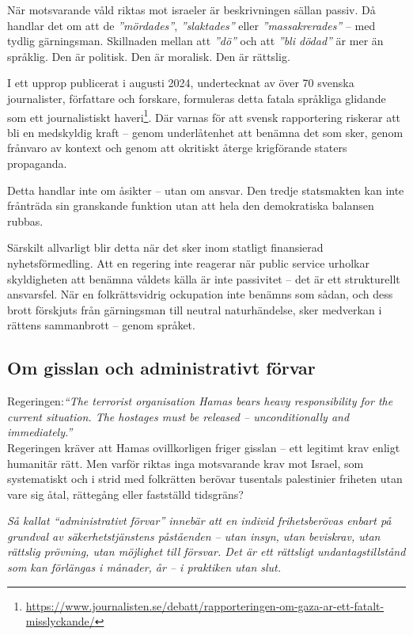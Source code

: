 \documentclass[12pt]{article}
\begin{document}
När motsvarande våld riktas mot israeler är beskrivningen sällan passiv. Då handlar det om att de \textit{”mördades”}, \textit{”slaktades”} eller \textit{”massakrerades”} – med tydlig gärningsman. Skillnaden mellan att \textit{”dö”} och att \textit{”bli dödad”} är mer än språklig. Den är politisk. Den är moralisk. Den är rättslig.

I ett upprop publicerat i augusti 2024, undertecknat av över 70 svenska journalister, författare och forskare, formuleras detta fatala språkliga glidande som ett journalistiskt haveri\footnote{\url{https://www.journalisten.se/debatt/rapporteringen-om-gaza-ar-ett-fatalt-misslyckande/}}. Där varnas för att svensk rapportering riskerar att bli en medskyldig kraft – genom underlåtenhet att benämna det som sker, genom frånvaro av kontext och genom att okritiskt återge krigförande staters propaganda.

Detta handlar inte om åsikter – utan om ansvar. Den tredje statsmakten kan inte frånträda sin granskande funktion utan att hela den demokratiska balansen rubbas.

Särskilt allvarligt blir detta när det sker inom statligt finansierad nyhetsförmedling. Att en regering inte reagerar när public service urholkar skyldigheten att benämna våldets källa är inte passivitet – det är ett strukturellt ansvarsfel. När en folkrättsvidrig ockupation inte benämns som sådan, och dess brott förskjuts från gärningsman till neutral naturhändelse, sker medverkan i rättens sammanbrott – genom språket.



\subsection*{Om gisslan och administrativt förvar}

Regeringen:\textit{“The terrorist organisation Hamas bears heavy responsibility for the current situation. The hostages must be released – unconditionally and immediately.”}\\

Regeringen kräver att Hamas ovillkorligen friger gisslan – ett legitimt krav enligt humanitär rätt. Men varför riktas inga motsvarande krav mot Israel, som systematiskt och i strid med folkrätten berövar tusentals palestinier friheten utan vare sig åtal, rättegång eller fastställd tidsgräns?

\textit{Så kallat “administrativt förvar” innebär att en individ frihetsberövas enbart på grundval av säkerhetstjänstens påståenden – utan insyn, utan beviskrav, utan rättslig prövning, utan möjlighet till försvar. Det är ett rättsligt undantagstillstånd som kan förlängas i månader, år – i praktiken utan slut.}
\end{document}
